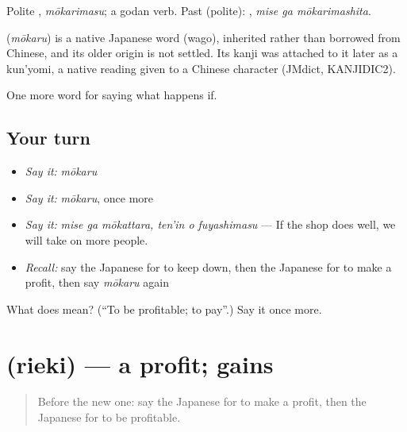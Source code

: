 Polite \textbf{}, \emph{mōkarimasu}; a godan verb. Past (polite): \textbf{ }, \emph{mise ga mōkarimashita}.

\begin{cousinweb}
\textbf{} (\emph{mōkaru}) is a native Japanese word (wago), inherited rather than borrowed from Chinese, and its older origin is not settled. Its kanji was attached to it later as a kun'yomi, a native reading given to a Chinese character (JMdict, KANJIDIC2).
\end{cousinweb}

\begin{grammarlens}[title={What you've built}]
One more word for saying what happens if.
\end{grammarlens}

\subsection*{Your turn}
\begin{itemize}
\raggedright
  \item \emph{Say it:} \emph{mōkaru}
  \item \emph{Say it:} \emph{mōkaru}, once more
  \item \emph{Say it:} \emph{mise ga mōkattara, ten'in o fuyashimasu} — If the shop does well, we will take on more people.
  \item \emph{Recall:} say the Japanese for to keep down, then the Japanese for to make a profit, then say \emph{mōkaru} again
\end{itemize}

\begin{tcolorbox}[breakable,colback=teal!4,colframe=teal!35!black,title={Before you move on}]
What does  mean? (\textquotedblleft{}To be profitable; to pay\textquotedblright{}.) Say it once more.
\end{tcolorbox}
\section[\texorpdfstring{\ja{りえき} (rieki)}{りえき (rieki)}]{ (rieki) — a profit; gains}

\label{lesson:JA-C361-rieki}



\begin{quote}
Before the new one: say the Japanese for to make a profit, then the Japanese for to be profitable.
\end{quote}

